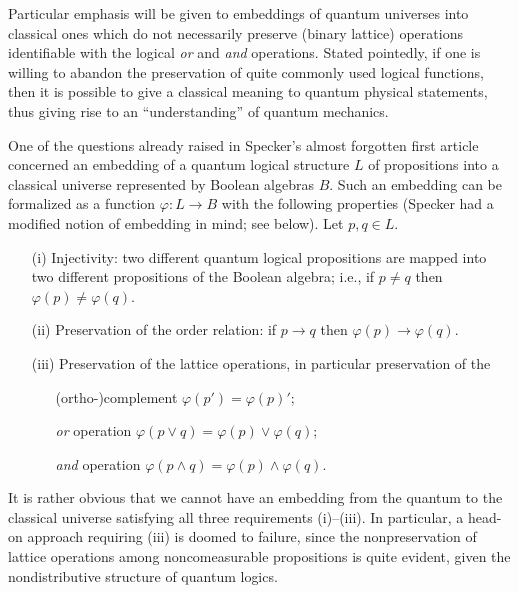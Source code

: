 \documentclass[%
  preprint,
 showpacs,
 showkeys,
 preprintnumbers,
 amsmath,amssymb,
 aps,
 rmp,
  longbibliography,
 ]{revtex4-1}
\begin{document}
Particular emphasis will be given to embeddings of
quantum universes into classical ones which do not
necessarily preserve (binary lattice) operations identifiable with the
logical {\it or} and {\it and} operations. Stated pointedly, if one is
willing to abandon the preservation of quite commonly used logical
functions, then it is possible to give a classical meaning to quantum
physical statements, thus giving rise to an ``understanding'' of
quantum mechanics.


One of the questions already raised in Specker's almost forgotten first
article \cite{specker-60} concerned an embedding of a quantum
logical structure $L$ of propositions into a classical universe
represented by Boolean algebras $B$.  Such an embedding can be
formalized as a function $\varphi :L\rightarrow B$ with the following
properties (Specker had a modified notion of embedding in mind; see
below).  Let $p,q\in L$.

\begin{itemize}

\item[(i)]
Injectivity:
two different quantum logical propositions are mapped into two
different propositions of the Boolean algebra; i.e., if $p\neq
q $ then $ \varphi (p)\neq \varphi (q)$.

\item[(ii)]
Preservation of the order relation:
if $p\rightarrow q$ then $\varphi (p) \rightarrow \varphi (q)$.


\item[(iii)]
Preservation of the lattice operations, in particular preservation of the
\begin{itemize}
\item[(ortho-)complement]
$\varphi(p')=\varphi (p)'$;
\item[{\it or} operation] $\varphi
(p\vee q)=\varphi (p) \vee \varphi (q)$;
\item[{\it and} operation] $\varphi
(p\wedge q)=\varphi (p) \wedge \varphi (q)$.
\end{itemize}
\end{itemize}

It is rather obvious that we cannot have an embedding from the
quantum to
the classical universe satisfying all three requirements (i)--(iii).  In
particular, a head-on approach requiring (iii) is doomed to failure,
since the nonpreservation of lattice operations among
noncomeasurable propositions is quite evident, given the nondistributive
structure of quantum logics.
\end{document}
